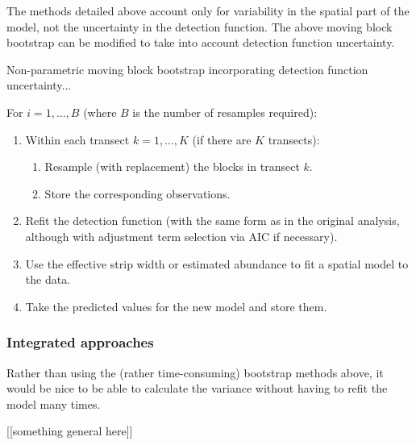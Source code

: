 \documentclass[useAMS,referee]{biom}
\begin{document}
The methods detailed above account only for variability in the spatial part of the model, not the uncertainty in the detection function. The above moving block bootstrap can be modified to take into account detection function uncertainty.




Non-parametric moving block bootstrap incorporating detection function uncertainty...

For $i=1,\ldots,B$ (where $B$ is the number of resamples required):
\begin{enumerate}

	\item Within each transect $k=1,\ldots,K$ (if there are $K$ transects):
	\begin{enumerate}
		\item Resample (with replacement) the blocks in transect $k$.
		\item Store the corresponding observations.
	\end{enumerate}
	\item Refit the detection function (with the same form as in the original analysis, although with adjustment term selection via AIC if necessary).
	\item Use the effective strip width or estimated abundance to fit a spatial model to the data.
	\item Take the predicted values for the new model and store them.
\end{enumerate}


\subsubsection{Integrated approaches}

Rather than using the (rather time-consuming) bootstrap methods above, it would be nice to be able to calculate the variance without having to refit the model many times.

[[something general here]]
\end{document}
